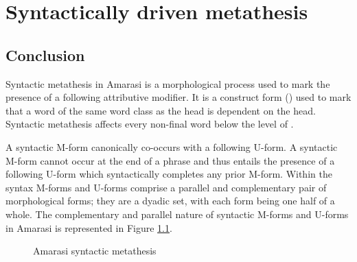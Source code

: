\chapter{Syntactically driven metathesis}\label{ch:SynMet}




	
	
	
	
	

	
	
	




\section{Conclusion}
Syntactic metathesis in Amarasi is a morphological process
used to mark the presence of a following attributive modifier.
It is a construct form () used to mark that a word
of the same word class as the head is dependent on the head.
Syntactic metathesis affects every non-final word below the level of .

A syntactic M-form canonically co-occurs with a following U-form.
A syntactic M-form cannot occur at the end of a phrase
and thus entails the presence of a following U-form
which syntactically completes any prior M-form.
Within the syntax M-forms and U-forms
comprise a parallel and complementary pair of morphological forms;
they are a dyadic set, with each form being one half of a whole.
The complementary and parallel nature of syntactic M-forms and U-forms
in Amarasi is represented in Figure \ref{fig:AmaSynMet}.

\begin{figure}[h]
	\caption{Amarasi syntactic metathesis}\label{fig:AmaSynMet}
\end{figure}